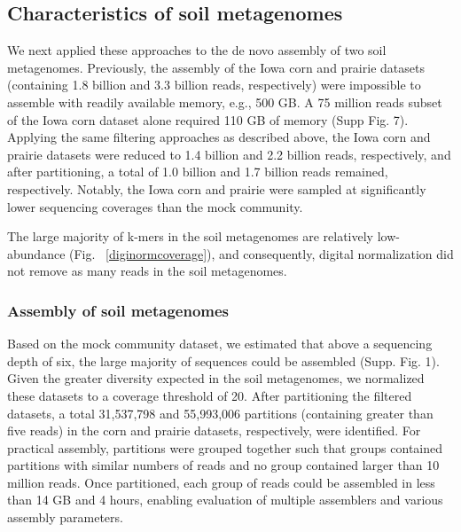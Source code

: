 \documentclass[11pt]{article} %
\begin{document}
\subsection{Characteristics of soil metagenomes}

We next applied these approaches to the de novo assembly of two soil
metagenomes.  Previously, the assembly of the Iowa corn and prairie
datasets (containing 1.8 billion and 3.3 billion reads, respectively)
were impossible to assemble with readily available memory, e.g., 500
GB.  A 75 million reads subset of the Iowa corn dataset alone required
110 GB of memory (Supp Fig. 7).  Applying the same
filtering approaches as described above, the Iowa corn and prairie
datasets were reduced to 1.4 billion and 2.2 billion reads,
respectively, and after partitioning, a total of 1.0 billion and 1.7
billion reads remained, respectively.  Notably, the Iowa corn and
prairie were sampled at significantly lower sequencing coverages than
the mock community.


The large majority of k-mers in the soil metagenomes are relatively
low-abundance (Fig. ~\ref{diginormcoverage}), and consequently,
digital normalization did not remove as many reads in the soil
metagenomes.

\subsubsection{Assembly of soil metagenomes}

Based on the mock community dataset, we estimated that above a
sequencing depth of six, the large majority of sequences could be
assembled (Supp. Fig. 1).  Given the greater
diversity expected in the soil metagenomes, we normalized these
datasets to a coverage threshold of 20.  After partitioning the
filtered datasets, a total 31,537,798 and 55,993,006 partitions
(containing greater than five reads) in the corn and prairie datasets,
respectively, were identified.  For practical assembly, partitions
were grouped together such that groups contained partitions with
similar numbers of reads and no group contained larger than 10 million
reads.  Once partitioned, each group of reads could be assembled in
less than 14 GB and 4 hours, enabling evaluation of multiple
assemblers and various assembly parameters.
\end{document}
